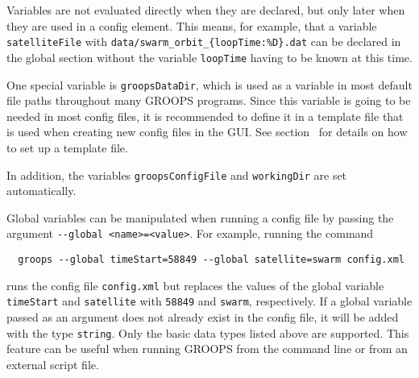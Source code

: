 Variables are not evaluated directly when they are declared, but only later when they are used in a config element.
This means, for example, that a variable \verb|satelliteFile| with \verb|data/swarm_orbit_{loopTime:%D}.dat|
can be declared in the global section without the variable \verb|loopTime| having to be known at this time.

One special variable is \verb|groopsDataDir|, which is used as a variable in most default
file paths throughout many GROOPS programs. Since this variable is going to be needed in
most config files, it is recommended to define it in a template file that is used when creating
new config files in the GUI. See section~
for details on how to set up a template file.

In addition, the variables \verb|groopsConfigFile| and \verb|workingDir| are set automatically.

Global variables can be manipulated when running a config file by passing the argument \verb|--global <name>=<value>|.
For example, running the command
\begin{verbatim}
  groops --global timeStart=58849 --global satellite=swarm config.xml
\end{verbatim}
runs the config file \verb|config.xml| but replaces the values of the global variable \verb|timeStart|
and \verb|satellite| with \verb|58849| and \verb|swarm|, respectively. If a global variable passed as
an argument does not already exist in the config file, it will be added with the type \verb|string|.
Only the basic data types listed above are supported. This feature can be useful when running GROOPS
from the command line or from an external script file.
